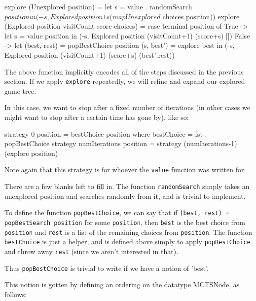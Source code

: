 \begin{code}

explore (Unexplored position) =
  let s = value . randomSearch $ position in
  (-s, Explored position 1 s (map Unexplored $ choices position))
explore (Explored position visitCount score choices) = 
  case terminal position of
    True ->
      let s = value position in
      (-s, Explored position (visitCount+1) (score+s) [])
    False ->
      let (best, rest) = popBestChoice position
          (s, best') = explore best in
          (-s, Explored position (visitCount+1) (score+s) (best':rest))

\end{code}

The above function implicitly encodes all of the steps discussed in the previous section.
If we apply \texttt{explore} repeatedly, we will refine and expand our explored game tree.

In this case, we want to stop after a fixed number of iterations (in other cases we might want to stop after a certain time has gone by), like so:

\begin{code}
  strategy 0 position =
    bestChoice position
    where
    bestChoice = fst . popBestChoice
  strategy numIterations position  = 
    strategy (numIterations-1) (explore position)
\end{code}

Note again that this strategy is for whoever the \texttt{value} function was written for.

There are a few blanks left to fill in.
The function \texttt{randomSearch} simply takes an unexplored position and searches randomly from it, and is trivial to implement.

To define the function \texttt{popBestChoice}, we can say that if \texttt{(best, rest) = popBestSearch position} for some \texttt{position}, then \texttt{best} is the best choice from \texttt{position} and \texttt{rest} is a list of the remaining choices from \texttt{position}.
The function \texttt{bestChoice} is just a helper, and is defined above simply to apply \texttt{popBestChoice} and throw away \texttt{rest} (since we aren't interested in that).

Thus \texttt{popBestChoice} is trivial to write if we have a notion of 'best'.

This notion is gotten by defining an ordering on the datatype MCTSNode, as follows:



